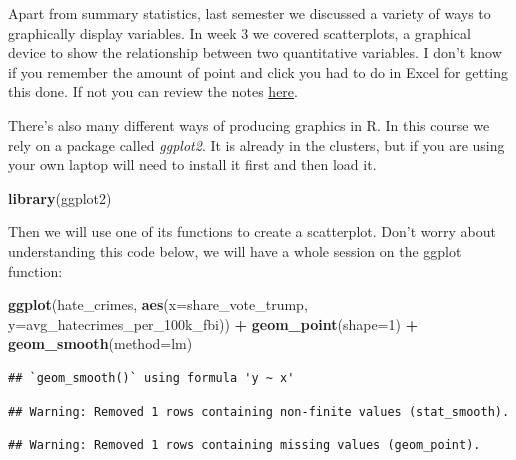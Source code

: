 \documentclass[]{book}
\newenvironment{Shaded}{\begin{snugshade}}{\end{snugshade}}
\newcommand{\DataTypeTok}[1]{\textcolor[rgb]{0.13,0.29,0.53}{#1}}
\newcommand{\DecValTok}[1]{\textcolor[rgb]{0.00,0.00,0.81}{#1}}
\newcommand{\KeywordTok}[1]{\textcolor[rgb]{0.13,0.29,0.53}{\textbf{#1}}}
\newcommand{\NormalTok}[1]{#1}
\newcommand{\OperatorTok}[1]{\textcolor[rgb]{0.81,0.36,0.00}{\textbf{#1}}}
\newcommand{\StringTok}[1]{\textcolor[rgb]{0.31,0.60,0.02}{#1}}
\begin{document}
Apart from summary statistics, last semester we discussed a variety of ways to graphically display variables. In week 3 we covered scatterplots, a graphical device to show the relationship between two quantitative variables. I don't know if you remember the amount of point and click you had to do in Excel for getting this done. If not you can review the notes \href{https://rawgit.com/maczokni/MSCD/master/Lesson_3.html\#visualising-the-differences-between-groups}{here}.

There's also many different ways of producing graphics in R. In this course we rely on a package called \emph{ggplot2}. It is already in the clusters, but if you are using your own laptop will need to install it first and then load it.

\begin{Shaded}
\begin{Highlighting}[]
\KeywordTok{library}\NormalTok{(ggplot2)}
\end{Highlighting}
\end{Shaded}

Then we will use one of its functions to create a scatterplot. Don't worry about understanding this code below, we will have a whole session on the ggplot function:

\begin{Shaded}
\begin{Highlighting}[]
\KeywordTok{ggplot}\NormalTok{(hate_crimes, }\KeywordTok{aes}\NormalTok{(}\DataTypeTok{x=}\NormalTok{share_vote_trump, }\DataTypeTok{y=}\NormalTok{avg_hatecrimes_per_100k_fbi)) }\OperatorTok{+}
\StringTok{    }\KeywordTok{geom_point}\NormalTok{(}\DataTypeTok{shape=}\DecValTok{1}\NormalTok{) }\OperatorTok{+}
\StringTok{     }\KeywordTok{geom_smooth}\NormalTok{(}\DataTypeTok{method=}\NormalTok{lm)}
\end{Highlighting}
\end{Shaded}

\begin{verbatim}
## `geom_smooth()` using formula 'y ~ x'
\end{verbatim}

\begin{verbatim}
## Warning: Removed 1 rows containing non-finite values (stat_smooth).
\end{verbatim}

\begin{verbatim}
## Warning: Removed 1 rows containing missing values (geom_point).
\end{verbatim}
\end{document}
